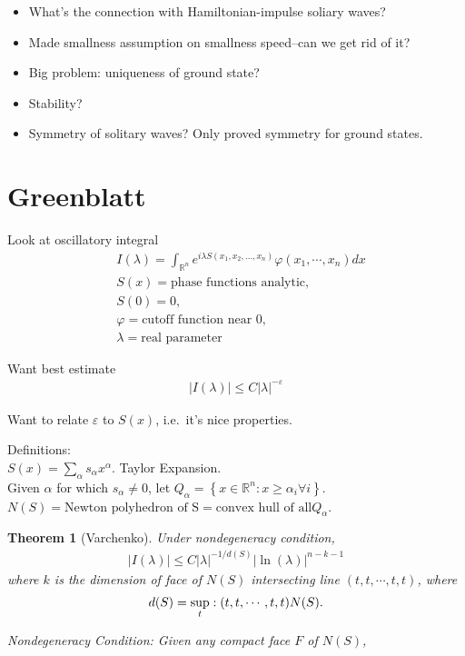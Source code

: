 \documentclass[12pt,reqno]{amsart}
\numberwithin{equation}{section}  %
\newcommand{\nin}{\noindent}
\newcommand{\rr}{\mathbb{R}}
\newcommand{\ee}{\varepsilon}
\newcommand{\vp}{\varphi}
\newtheorem{theorem}{Theorem}[section]
\begin{document}
  \begin{itemize}
    \item{}
      What's the connection with Hamiltonian-impulse soliary waves?
    \item{}
      Made smallness assumption on smallness speed--can we get rid of it?
    \item{}
      Big problem: uniqueness of ground state?
    \item{}
      Stability?
    \item{}
      Symmetry of solitary waves? Only proved symmetry for ground states.
  \end{itemize}
\section{Greenblatt}
\begin{itemize}
\item{}
Look at oscillatory integral
\begin{equation*}
\begin{split}
& I(\lambda) = \int_{\rr^{n}} e^{i \lambda S(x_{1}, x_{2}, \ldots, x_{n})} \vp(x_{1}, \cdots, x_{n}) dx
\\
& S(x) = \text{phase functions analytic},
\\
& S(0) = 0, 
\\
& \vp = \text{cutoff function near 0}, 
\\
& \lambda=\text{real parameter}
\end{split}
\end{equation*}
\item{}
Want best estimate
\begin{gather*}
  | I(\lambda) | \le C| \lambda |^{-\ee}
\end{gather*}
\item{}
Want to relate $\ee$ to $S(x)$, i.e.\ it's nice properties.
\item Definitions:
\\
$S(x) = \sum_{\alpha} s_{\alpha} x^{\alpha}$. Taylor Expansion.
\\
Given $\alpha$ for which $s_{\alpha}\neq 0$, let $Q_\alpha = \left\{ x \in \rr^{n}: x \ge \alpha_{i} \forall i \right\}$.
\\
$N(S) = \text{Newton polyhedron of S}= \text{convex hull of all} Q_{\alpha}$.
  \begin{theorem}[Varchenko]
    Under nondegeneracy condition,
    \begin{gather*}
      | I(\lambda) | \le C| \lambda |^{-1/d(S)} | \ln(\lambda) |^{n-k-1}
    \end{gather*}
    where $k$ is the dimension of face of $N(S)$ intersecting line $(t, t, \cdots, t, t)$, where
    \begin{gather*}
      d(S) = \sup_{t}: (t, t, \cdots, t, t) \nin N(S).
    \end{gather*}
    \item{}
      Nondegeneracy Condition: Given any compact face $F$ of $N(S)$,
     

\end{theorem}
\end{itemize}
\end{document}

